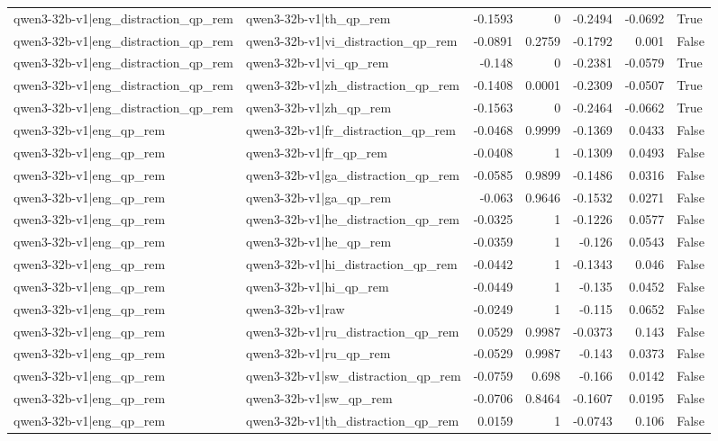 \begin{table}
\begin{tabular}{l l r r r r l}
qwen3-32b-v1|eng_distraction_qp_rem & qwen3-32b-v1|th_qp_rem & -0.1593 & 0 & -0.2494 & -0.0692 & True \\
qwen3-32b-v1|eng_distraction_qp_rem & qwen3-32b-v1|vi_distraction_qp_rem & -0.0891 & 0.2759 & -0.1792 & 0.001 & False \\
qwen3-32b-v1|eng_distraction_qp_rem & qwen3-32b-v1|vi_qp_rem & -0.148 & 0 & -0.2381 & -0.0579 & True \\
qwen3-32b-v1|eng_distraction_qp_rem & qwen3-32b-v1|zh_distraction_qp_rem & -0.1408 & 0.0001 & -0.2309 & -0.0507 & True \\
qwen3-32b-v1|eng_distraction_qp_rem & qwen3-32b-v1|zh_qp_rem & -0.1563 & 0 & -0.2464 & -0.0662 & True \\
qwen3-32b-v1|eng_qp_rem & qwen3-32b-v1|fr_distraction_qp_rem & -0.0468 & 0.9999 & -0.1369 & 0.0433 & False \\
qwen3-32b-v1|eng_qp_rem & qwen3-32b-v1|fr_qp_rem & -0.0408 & 1 & -0.1309 & 0.0493 & False \\
qwen3-32b-v1|eng_qp_rem & qwen3-32b-v1|ga_distraction_qp_rem & -0.0585 & 0.9899 & -0.1486 & 0.0316 & False \\
qwen3-32b-v1|eng_qp_rem & qwen3-32b-v1|ga_qp_rem & -0.063 & 0.9646 & -0.1532 & 0.0271 & False \\
qwen3-32b-v1|eng_qp_rem & qwen3-32b-v1|he_distraction_qp_rem & -0.0325 & 1 & -0.1226 & 0.0577 & False \\
qwen3-32b-v1|eng_qp_rem & qwen3-32b-v1|he_qp_rem & -0.0359 & 1 & -0.126 & 0.0543 & False \\
qwen3-32b-v1|eng_qp_rem & qwen3-32b-v1|hi_distraction_qp_rem & -0.0442 & 1 & -0.1343 & 0.046 & False \\
qwen3-32b-v1|eng_qp_rem & qwen3-32b-v1|hi_qp_rem & -0.0449 & 1 & -0.135 & 0.0452 & False \\
qwen3-32b-v1|eng_qp_rem & qwen3-32b-v1|raw & -0.0249 & 1 & -0.115 & 0.0652 & False \\
qwen3-32b-v1|eng_qp_rem & qwen3-32b-v1|ru_distraction_qp_rem & 0.0529 & 0.9987 & -0.0373 & 0.143 & False \\
qwen3-32b-v1|eng_qp_rem & qwen3-32b-v1|ru_qp_rem & -0.0529 & 0.9987 & -0.143 & 0.0373 & False \\
qwen3-32b-v1|eng_qp_rem & qwen3-32b-v1|sw_distraction_qp_rem & -0.0759 & 0.698 & -0.166 & 0.0142 & False \\
qwen3-32b-v1|eng_qp_rem & qwen3-32b-v1|sw_qp_rem & -0.0706 & 0.8464 & -0.1607 & 0.0195 & False \\
qwen3-32b-v1|eng_qp_rem & qwen3-32b-v1|th_distraction_qp_rem & 0.0159 & 1 & -0.0743 & 0.106 & False \\

\end{tabular}
\end{table}
